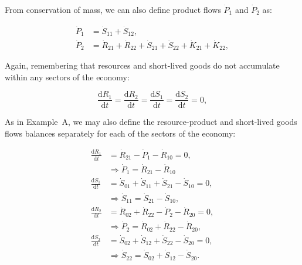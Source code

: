 


From conservation of mass,
we can also define product flows
$\dot{P}_{1}$ and $\dot{P}_{2}$ as:

\begin{align}
\label{eq:B_P1_def}
	\dot{P}_{1}				&
	= \dot{S}_{11}
	+ \dot{S}_{12},			\\
\label{eq:B_P2_def}
	\dot{P}_{2}				&
	= \dot{R}_{21}
	+ \dot{R}_{22}
	+ \dot{S}_{21}
	+ \dot{S}_{22}
	+ \dot{K}_{21}	 
	+ \dot{K}_{22},
\end{align}


\noindent Again, remembering that resources and short-lived
goods do not accumulate within any sectors of the economy:

\begin{equation}\label{eq:dR_and_dS_zero}
	\frac{\mathrm{d}R_{1}}{\mathrm{d}t}
	= \frac{\mathrm{d}R_{2}}{\mathrm{d}t} 
	= \frac{\mathrm{d}S_{1}}{\mathrm{d}t} 
	= \frac{\mathrm{d}S_{2}}{\mathrm{d}t} 
	= 0,
\end{equation}

As in Example~A,
we may also define the resource-product
and short-lived goods flows balances separately
for each of the sectors of the economy:

\begin{align}
	\frac{\mathrm{d}R_{1}}{\mathrm{d}t} 	&
	= \dot{R}_{21}
	- \dot{P}_{1}
	- \dot{R}_{10}
	= 0,										\nonumber	\\
\label{eq:B_P1a}
																	&
	\Longrightarrow
	\dot{P}_{1}
	= \dot{R}_{21}
	- \dot{R}_{10}											\\
\label{eq:B_dS1}
	\frac{\mathrm{d}S_{1}}{\mathrm{d}t} 	&
	= \dot{S}_{01}
	+ \dot{S}_{11}
	+ \dot{S}_{21}
	- \dot{S}_{10}
	= 0,															\\
\label{eq:B_S11}
																	&
	\Longrightarrow
	\dot{S}_{11}
	= \dot{S}_{21}
	- \dot{S}_{10},										\\
	\frac{\mathrm{d}R_{2}}{\mathrm{d}t} 	&
	= \dot{R}_{02}
	+ \dot{R}_{22}
	- \dot{P}_{2}
	- \dot{R}_{20}
	= 0,															\\
\label{eq:B_P2a}
																	&
	\Longrightarrow
	\dot{P}_{2}
	= \dot{R}_{02}
	+ \dot{R}_{22}
	- \dot{R}_{20},										\\
\label{eq:B_dS2}
	\frac{\mathrm{d}S_{2}}{\mathrm{d}t} 	&
	= \dot{S}_{02}
	+ \dot{S}_{12}
	+ \dot{S}_{22}
	- \dot{S}_{20}
	= 0,															\\
\label{eq:B_S22}
																	&
	\Longrightarrow
	\dot{S}_{22}
	= \dot{S}_{02}
	+ \dot{S}_{12} 
	- \dot{S}_{20}.	
\end{align}

